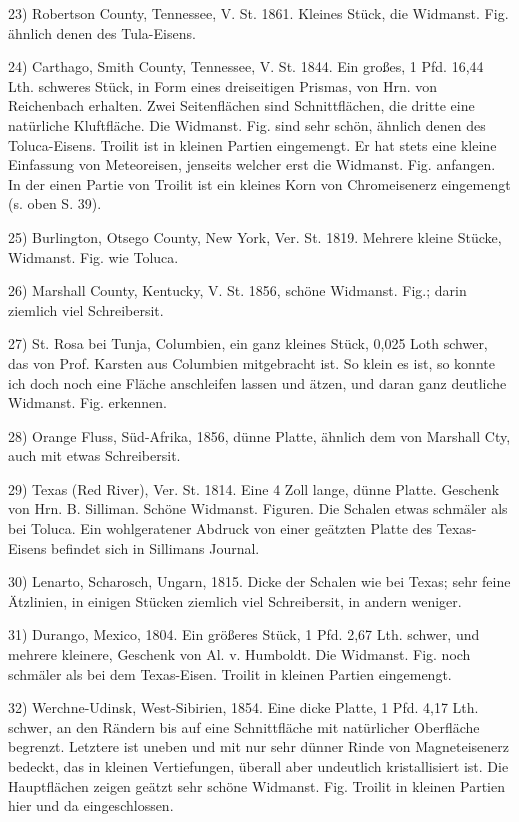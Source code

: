 \documentclass[a4paper, 11pt, oneside]{article}
\begin{document}
23) Robertson County, Tennessee, V. St. 1861. Kleines Stück, die Widmanst. Fig. ähnlich denen des Tula-Eisens.

24) Carthago, Smith County, Tennessee, V. St. 1844. Ein großes, 1 Pfd. 16,44 Lth. schweres Stück, in Form eines dreiseitigen Prismas, von Hrn. von Reichenbach erhalten. Zwei Seitenflächen sind Schnittflächen, die dritte eine natürliche Kluftfläche. Die Widmanst. Fig. sind sehr schön, ähnlich denen des Toluca-Eisens. Troilit ist in kleinen Partien eingemengt. Er hat stets eine kleine Einfassung von Meteoreisen, jenseits welcher erst die Widmanst. Fig. anfangen. In der einen Partie von Troilit ist ein kleines Korn von Chromeisenerz eingemengt (s. oben S. 39).

25) Burlington, Otsego County, New York, Ver. St. 1819. Mehrere kleine Stücke, Widmanst. Fig. wie Toluca.

26) Marshall County, Kentucky, V. St. 1856, schöne Widmanst. Fig.; darin ziemlich viel Schreibersit.

27) St. Rosa bei Tunja, Columbien, ein ganz kleines Stück, 0,025 Loth schwer, das von Prof. Karsten aus Columbien mitgebracht ist. So klein es ist, so konnte ich doch noch eine Fläche anschleifen lassen und ätzen, und daran ganz deutliche Widmanst. Fig. erkennen.

28) Orange Fluss, Süd-Afrika, 1856, dünne Platte, ähnlich dem von Marshall Cty, auch mit etwas Schreibersit.

29) Texas (Red River), Ver. St. 1814. Eine 4 Zoll lange, dünne Platte. Geschenk von Hrn. B. Silliman. Schöne Widmanst. Figuren. Die Schalen etwas schmäler als bei Toluca. Ein wohlgeratener Abdruck von einer geätzten Platte des Texas-Eisens befindet sich in Sillimans Journal.

30) Lenarto, Scharosch, Ungarn, 1815. Dicke der Schalen wie bei Texas; sehr feine Ätzlinien, in einigen Stücken ziemlich viel Schreibersit, in andern weniger.

31) Durango, Mexico, 1804. Ein größeres Stück, 1 Pfd. 2,67 Lth. schwer, und mehrere kleinere, Geschenk von Al. v. Humboldt. Die Widmanst. Fig. noch schmäler als bei dem Texas-Eisen. Troilit in kleinen Partien eingemengt.

32) Werchne-Udinsk, West-Sibirien, 1854. Eine dicke Platte, 1 Pfd. 4,17 Lth. schwer, an den Rändern bis auf eine Schnittfläche mit natürlicher Oberfläche begrenzt. Letztere ist uneben und mit nur sehr dünner Rinde von Magneteisenerz bedeckt, das in kleinen Vertiefungen, überall aber undeutlich kristallisiert ist. Die Hauptflächen zeigen geätzt sehr schöne Widmanst. Fig. Troilit in kleinen Partien hier und da eingeschlossen.
\end{document}
